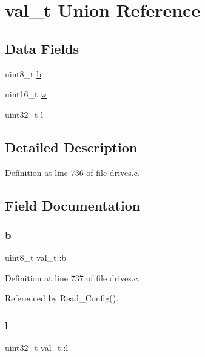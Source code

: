 \hypertarget{unionval__t}{}\section{val\+\_\+t Union Reference}
\label{unionval__t}
\subsection*{Data Fields}
\begin{DoxyCompactItemize}
\item 
uint8\+\_\+t \hyperlink{unionval__t_aa1beb825450163cb6c0f3bfeea7a8098}{b}
\item 
uint16\+\_\+t \hyperlink{unionval__t_a35ceb0f111824a2835370671131c38c0}{w}
\item 
uint32\+\_\+t \hyperlink{unionval__t_a9104daa7fde3f83545528fa75871bc84}{l}
\end{DoxyCompactItemize}


\subsection{Detailed Description}


Definition at line 736 of file drives.\+c.



\subsection{Field Documentation}
\mbox{\label{unionval__t_aa1beb825450163cb6c0f3bfeea7a8098}} 
\subsubsection{\texorpdfstring{b}{b}}
{\footnotesize\ttfamily uint8\+\_\+t val\+\_\+t\+::b}



Definition at line 737 of file drives.\+c.



Referenced by Read\+\_\+\+Config().

\mbox{\label{unionval__t_a9104daa7fde3f83545528fa75871bc84}} 
\subsubsection{\texorpdfstring{l}{l}}
{\footnotesize\ttfamily uint32\+\_\+t val\+\_\+t\+::l}



